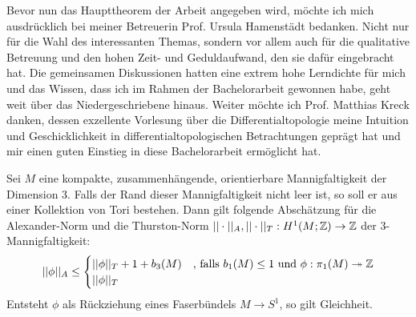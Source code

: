     Bevor nun das Haupttheorem der Arbeit angegeben wird, möchte ich mich ausdrücklich bei meiner Betreuerin Prof. Ursula Hamenstädt bedanken. Nicht nur für die Wahl des interessanten Themas, sondern vor allem auch für die qualitative Betreuung und den hohen Zeit- und Geduldaufwand, den sie dafür eingebracht hat. Die gemeinsamen Diskussionen hatten eine extrem hohe Lerndichte für mich und das Wissen, dass ich im Rahmen der Bachelorarbeit gewonnen habe, geht weit über das Niedergeschriebene hinaus. Weiter möchte ich Prof. Matthias Kreck danken, dessen exzellente Vorlesung über die Differentialtopologie meine Intuition und Geschicklichkeit in differentialtopologischen Betrachtungen geprägt hat und mir einen guten Einstieg in diese Bachelorarbeit ermöglicht hat.
\vfill
    \begin{thm}[McMullen]
    \label{thm:haupttheorem}
    	Sei $M$ eine kompakte, zusammenhängende, orientierbare Mannigfaltigkeit der Dimension 3. Falls der Rand dieser Mannigfaltigkeit nicht leer ist, so soll er aus einer Kollektion von Tori bestehen. Dann gilt folgende Abschätzung für die Alexander-Norm und die Thurston-Norm $||\cdot||_A ,||\cdot||_T : H^1(M;\mathbb{Z}) \to \mathbb{Z}$ der 3-Mannigfaltigkeit:
    	\[
    		||\phi||_A \leq 
    		\begin{cases}
    			||\phi||_T + 1+ b_3(M) &\text{, falls } b_1(M)\leq 1 \text{ und } \phi: \pi_1(M) \twoheadrightarrow \mathbb{Z} \\
    			||\phi||_T &
    		\end{cases}
    	\]
    	Entsteht $\phi$ als Rückziehung eines Faserbündels $M\to S^1$, so gilt Gleichheit.
    \end{thm}
    \vfill